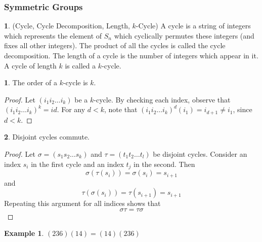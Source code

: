 \documentclass[12pt]{article}
\theoremstyle{definition}
\newtheorem{definition}{\color{NavyBlue}{\textbf{Definition}}}
\newtheorem{theorem}{\color{ForestGreen}{\textbf{Theorem}}}
\newtheorem{example}{\color{WildStrawberry}Example}
\theoremstyle{definition}
\begin{document}
\subsubsection{Symmetric Groups}
\begin{definition}(Cycle, Cycle Decomposition, Length, $k$-Cycle)
A cycle is a string of integers which represents the element of $S_n$ which cyclically permutes these integers (and fixes all other integers). The product of all the cycles is called the cycle decomposition. The length of a cycle is the number of integers which appear in it. A cycle of length $k$ is called a $k$-cycle. 
\end{definition}

\begin{theorem}
The order of a $k$-cycle is $k$. 
\end{theorem}
\begin{proof}
Let $(i_1 i_2 \ldots i_k)$ be a $k$-cycle. By checking each index, observe that $(i_1 i_2 \ldots i_k)^k = id$. For any $d < k$, note that $(i_1 i_2 \ldots i_k)^d (i_1) = i_{d+1} \neq i_1$, since $d < k$. 
\end{proof}

\begin{theorem}
Disjoint cycles commute.
\end{theorem}
\begin{proof}
Let $\sigma = (s_1 s_2 \ldots s_k)$ and $\tau = (t_1 t_2 \ldots t_l)$ be disjoint cycles. Consider an index $s_i$ in the first cycle and an index $t_j$ in the second. Then
\begin{equation}
\sigma(\tau(s_i)) = \sigma(s_i) = s_{i+1}
\end{equation}
and
\begin{equation}
\tau(\sigma(s_i)) = \tau(s_{i+1}) = s_{i+1}
\end{equation}
Repeating this argument for all indices shows that
\begin{equation}
\sigma \tau = \tau \sigma
\end{equation}
\end{proof}

\begin{example}
$(2 3 6) (1 4) = (1 4) (2 3 6)$
\end{example}
\end{document}
